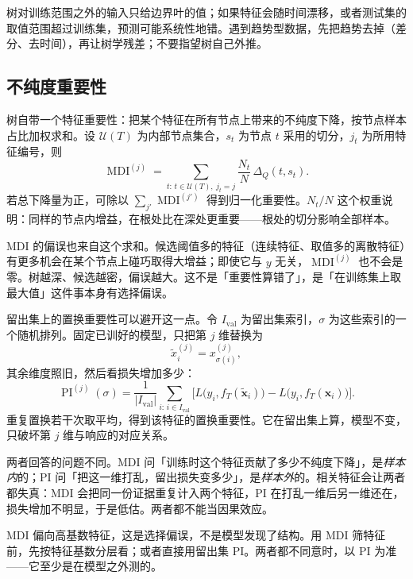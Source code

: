 \documentclass[11pt,a4paper,fontset=windows,zihao=-4]{ctexart}
\newcommand{\bx}{\boldsymbol{x}}
\DeclareMathOperator{\MDI}{MDI}
\DeclareMathOperator{\PI}{PI}
\newcommand{\Ucal}{\mathcal{U}}
\begin{document}
\begin{warn}[外推的边界]
树对训练范围之外的输入只给边界叶的值；如果特征会随时间漂移，或者测试集的取值范围超过训练集，预测可能系统性地错。遇到趋势型数据，先把趋势去掉（差分、去时间），再让树学残差；不要指望树自己外推。
\end{warn}

\subsection{不纯度重要性}

树自带一个特征重要性：把某个特征在所有节点上带来的不纯度下降，按节点样本占比加权求和。设 $\Ucal(T)$ 为内部节点集合，$s_t$ 为节点 $t$ 采用的切分，$j_t$ 为所用特征编号，则
\begin{equation}
  \MDI^{(j)}
  =\sum_{t:\,t\in\Ucal(T),\ j_t=j}\frac{N_t}{N}\,\Delta_Q(t,s_t).
  \label{eq:mdi}
\end{equation}
若总下降量为正，可除以 $\sum_{j'}\MDI^{(j')}$ 得到归一化重要性。$N_t/N$ 这个权重说明：同样的节点内增益，在根处比在深处更重要——根处的切分影响全部样本。

MDI 的偏误也来自这个求和。候选阈值多的特征（连续特征、取值多的离散特征）有更多机会在某个节点上碰巧取得大增益；即使它与 $y$ 无关，$\MDI^{(j)}$ 也不会是零。树越深、候选越密，偏误越大。这不是「重要性算错了」，是「在训练集上取最大值」这件事本身有选择偏误。

留出集上的置换重要性可以避开这一点。令 $I_{\mathrm{val}}$ 为留出集索引，$\sigma$ 为这些索引的一个随机排列。固定已训好的模型，只把第 $j$ 维替换为
\[
  \widetilde x_i^{(j)}=x_{\sigma(i)}^{(j)},
\]
其余维度照旧，然后看损失增加多少：
\begin{equation}
  \PI^{(j)}(\sigma)
  =\frac{1}{\lvert I_{\mathrm{val}}\rvert}
   \sum_{i:\,i\in I_{\mathrm{val}}}
   \bigl[L\bigl(y_i,f_T(\widetilde{\bx}_i)\bigr)-L\bigl(y_i,f_T(\bx_i)\bigr)\bigr].
  \label{eq:pi}
\end{equation}
重复置换若干次取平均，得到该特征的置换重要性。它在留出集上算，模型不变，只破坏第 $j$ 维与响应的对应关系。

两者回答的问题不同。MDI 问「训练时这个特征贡献了多少不纯度下降」，是\emph{样本内}的；PI 问「把这一维打乱，留出损失变多少」，是\emph{样本外}的。相关特征会让两者都失真：MDI 会把同一份证据重复计入两个特征，PI 在打乱一维后另一维还在，损失增加不明显，于是低估。两者都不能当因果效应。

\begin{warn}
MDI 偏向高基数特征，这是选择偏误，不是模型发现了结构。用 MDI 筛特征前，先按特征基数分层看；或者直接用留出集 PI。两者都不同意时，以 PI 为准——它至少是在模型之外测的。
\end{warn}
\end{document}
